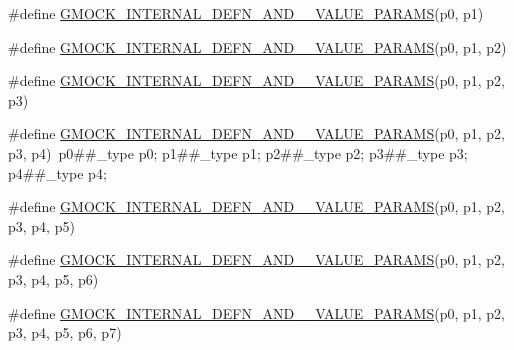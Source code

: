 \begin{DoxyCompactItemize}
\#define \mbox{\hyperlink{_obj__test_2lib_2googletest-release-1_88_81_2googlemock_2include_2gmock_2gmock-generated-actions_8h_a16aa4a04e77951b00534396170438deb}{G\+M\+O\+C\+K\+\_\+\+I\+N\+T\+E\+R\+N\+A\+L\+\_\+\+D\+E\+F\+N\+\_\+\+A\+N\+D\+\_\+\_\+\+V\+A\+L\+U\+E\+\_\+\+P\+A\+R\+A\+MS}}(p0,  p1)
\item 
\#define \mbox{\hyperlink{_obj__test_2lib_2googletest-release-1_88_81_2googlemock_2include_2gmock_2gmock-generated-actions_8h_a584f78b5777db084208f151d7e4d51b7}{G\+M\+O\+C\+K\+\_\+\+I\+N\+T\+E\+R\+N\+A\+L\+\_\+\+D\+E\+F\+N\+\_\+\+A\+N\+D\+\_\+\_\+\+V\+A\+L\+U\+E\+\_\+\+P\+A\+R\+A\+MS}}(p0,  p1,  p2)
\item 
\#define \mbox{\hyperlink{_obj__test_2lib_2googletest-release-1_88_81_2googlemock_2include_2gmock_2gmock-generated-actions_8h_a1c04daeff7ae92839f33727e264f227f}{G\+M\+O\+C\+K\+\_\+\+I\+N\+T\+E\+R\+N\+A\+L\+\_\+\+D\+E\+F\+N\+\_\+\+A\+N\+D\+\_\+\_\+\+V\+A\+L\+U\+E\+\_\+\+P\+A\+R\+A\+MS}}(p0,  p1,  p2,  p3)
\item 
\#define \mbox{\hyperlink{_obj__test_2lib_2googletest-release-1_88_81_2googlemock_2include_2gmock_2gmock-generated-actions_8h_ae8e67227205c5f57cbe9c885271d8f82}{G\+M\+O\+C\+K\+\_\+\+I\+N\+T\+E\+R\+N\+A\+L\+\_\+\+D\+E\+F\+N\+\_\+\+A\+N\+D\+\_\+\_\+\+V\+A\+L\+U\+E\+\_\+\+P\+A\+R\+A\+MS}}(p0,  p1,  p2,  p3,  p4)~p0\#\#\+\_\+type p0; p1\#\#\+\_\+type p1; p2\#\#\+\_\+type p2; p3\#\#\+\_\+type p3; p4\#\#\+\_\+type p4;
\item 
\#define \mbox{\hyperlink{_obj__test_2lib_2googletest-release-1_88_81_2googlemock_2include_2gmock_2gmock-generated-actions_8h_a4ba5920542abfa689a6517d21eb8860a}{G\+M\+O\+C\+K\+\_\+\+I\+N\+T\+E\+R\+N\+A\+L\+\_\+\+D\+E\+F\+N\+\_\+\+A\+N\+D\+\_\+\_\+\+V\+A\+L\+U\+E\+\_\+\+P\+A\+R\+A\+MS}}(p0,  p1,  p2,  p3,  p4,  p5)
\item 
\#define \mbox{\hyperlink{_obj__test_2lib_2googletest-release-1_88_81_2googlemock_2include_2gmock_2gmock-generated-actions_8h_aa0f3292bceb484af4271eb50de9d5ead}{G\+M\+O\+C\+K\+\_\+\+I\+N\+T\+E\+R\+N\+A\+L\+\_\+\+D\+E\+F\+N\+\_\+\+A\+N\+D\+\_\+\_\+\+V\+A\+L\+U\+E\+\_\+\+P\+A\+R\+A\+MS}}(p0,  p1,  p2,  p3,  p4,  p5,  p6)
\item 
\#define \mbox{\hyperlink{_obj__test_2lib_2googletest-release-1_88_81_2googlemock_2include_2gmock_2gmock-generated-actions_8h_a028ed15e5ba3301a85b859792e9fb7c9}{G\+M\+O\+C\+K\+\_\+\+I\+N\+T\+E\+R\+N\+A\+L\+\_\+\+D\+E\+F\+N\+\_\+\+A\+N\+D\+\_\+\_\+\+V\+A\+L\+U\+E\+\_\+\+P\+A\+R\+A\+MS}}(p0,  p1,  p2,  p3,  p4,  p5,  p6,  p7)
\item 

\end{DoxyCompactItemize}
